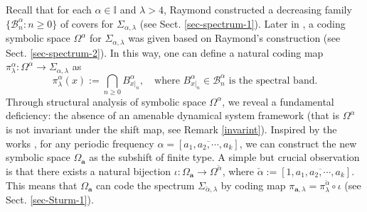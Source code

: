 \documentclass[reqno,11pt,graphicx,]{amsart}
\numberwithin{equation}{section}
\theoremstyle{plain}
\newcommand{\I}{{\mathbb I}}
\newcommand{\B}{{\mathcal B}}
\newcommand{\3}{\mathbf{3}}
\newcommand{\ma}{\mathbf{a}}
\begin{document}
	Recall that for each $\alpha\in\I$ and $\lambda>4$, Raymond  \cite{Ra1997} constructed a decreasing family $\{\B_n^\alpha:n\ge0\}$ of covers for $\Sigma_{\alpha,\lambda}$ (see Sect. \ref{sec-spectrum-1}).  
	Later in \cite{LQW2014,Qu2016,Qu2018},  a coding symbolic space $\Omega^\alpha$ for $\Sigma_{\alpha,\lambda}$  was given based on Raymond's construction (see Sect. \ref{sec-spectrum-2}). In this way, one can define a natural coding map 
	$\pi^\alpha_\lambda: \Omega^\alpha\to \Sigma_{\alpha,\lambda}$ as
	\begin{equation}
		\pi^{\alpha}_\lambda(x):=\bigcap_{n\ge 0} B_{x|_n}^{\alpha},\quad\text{where\ }B_{x|_n}^{\alpha}\in \B_n^\alpha\text{ is the spectral band}.
	\end{equation}
Through structural analysis of symbolic space $\Omega^{\alpha}$, we reveal a fundamental deficiency: the absence of an amenable dynamical system framework (that is $\Omega^{\alpha}$ is not invariant under the shift map, see Remark \ref{invarint}). Inspired by the works \cite{CQ2023,Qu2016}, for any periodic frequency $\alpha=[\overline{a_1,a_2,\cdots,a_k}]$, we can construct the new symbolic space $\Omega_{\ma}$ as the subshift of finite type. A simple but crucial observation is that there exists a natural bijection $\iota:\Omega_{\ma}\to\Omega^{\check{\alpha}}$, where $\check{\alpha}:=[1,\overline{a_1,a_2,\cdots,a_k}]$.  This means that $\Omega_{\ma}$ can code the spectrum $\Sigma_{\check{\alpha},\lambda}$ by coding map $\pi_{\ma,\lambda}=\pi^{\check{\alpha}}_{\lambda}\circ\iota$ (see Sect. \ref{sec-Sturm-1}). %
	
\end{document}
